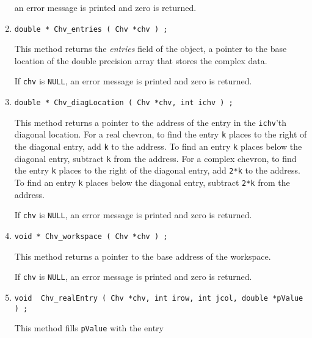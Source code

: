 \begin{enumerate}
an error message is printed and zero is returned.
\item
\begin{verbatim}
double * Chv_entries ( Chv *chv ) ;
\end{verbatim}
This method returns the {\it entries} field of the object,
a pointer to the base location of the double precision array that
stores the complex data.
\par {}
If {\tt chv} is {\tt NULL},
an error message is printed and zero is returned.
\item
\begin{verbatim}
double * Chv_diagLocation ( Chv *chv, int ichv ) ;
\end{verbatim}
This method returns a pointer to the address of the entry in
the {\tt ichv}'th diagonal location.
For a real chevron,
to find the entry {\tt k} places to the right of the diagonal entry, 
add {\tt k} to the address.
To find an entry {\tt k} places below the diagonal entry, 
subtract {\tt k} from the address.
For a complex chevron,
to find the entry {\tt k} places to the right of the diagonal entry, 
add {\tt 2*k} to the address.
To find an entry {\tt k} places below the diagonal entry, 
subtract {\tt 2*k} from the address.
\par {}
If {\tt chv} is {\tt NULL},
an error message is printed and zero is returned.
\item
\begin{verbatim}
void * Chv_workspace ( Chv *chv ) ;
\end{verbatim}
This method returns a pointer to the base address of the workspace.
\par {}
If {\tt chv} is {\tt NULL},
an error message is printed and zero is returned.
\item
\begin{verbatim}
void  Chv_realEntry ( Chv *chv, int irow, int jcol, double *pValue ) ;
\end{verbatim}
This method fills {\tt *pValue} with the entry 

\end{enumerate}

